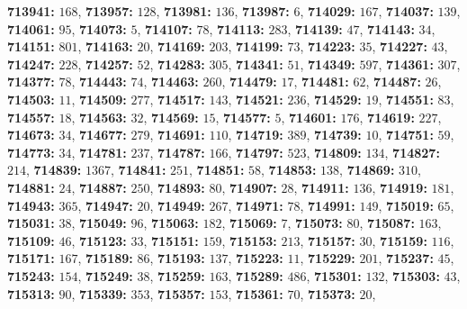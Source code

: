 \textsf{\bfseries 713941:} $168$, \textsf{\bfseries 713957:} $128$, \textsf{\bfseries 713981:} $136$, \textsf{\bfseries 713987:} $6$, \textsf{\bfseries 714029:} $167$, \textsf{\bfseries 714037:} $139$, \textsf{\bfseries 714061:} $95$, \textsf{\bfseries 714073:} $5$, \textsf{\bfseries 714107:} $78$, \textsf{\bfseries 714113:} $283$, \textsf{\bfseries 714139:} $47$, \textsf{\bfseries 714143:} $34$, \textsf{\bfseries 714151:} $801$, \textsf{\bfseries 714163:} $20$, \textsf{\bfseries 714169:} $203$, \textsf{\bfseries 714199:} $73$, \textsf{\bfseries 714223:} $35$, \textsf{\bfseries 714227:} $43$, \textsf{\bfseries 714247:} $228$, \textsf{\bfseries 714257:} $52$, \textsf{\bfseries 714283:} $305$, \textsf{\bfseries 714341:} $51$, \textsf{\bfseries 714349:} $597$, \textsf{\bfseries 714361:} $307$, \textsf{\bfseries 714377:} $78$, \textsf{\bfseries 714443:} $74$, \textsf{\bfseries 714463:} $260$, \textsf{\bfseries 714479:} $17$, \textsf{\bfseries 714481:} $62$, \textsf{\bfseries 714487:} $26$, \textsf{\bfseries 714503:} $11$, \textsf{\bfseries 714509:} $277$, \textsf{\bfseries 714517:} $143$, \textsf{\bfseries 714521:} $236$, \textsf{\bfseries 714529:} $19$, \textsf{\bfseries 714551:} $83$, \textsf{\bfseries 714557:} $18$, \textsf{\bfseries 714563:} $32$, \textsf{\bfseries 714569:} $15$, \textsf{\bfseries 714577:} $5$, \textsf{\bfseries 714601:} $176$, \textsf{\bfseries 714619:} $227$, \textsf{\bfseries 714673:} $34$, \textsf{\bfseries 714677:} $279$, \textsf{\bfseries 714691:} $110$, \textsf{\bfseries 714719:} $389$, \textsf{\bfseries 714739:} $10$, \textsf{\bfseries 714751:} $59$, \textsf{\bfseries 714773:} $34$, \textsf{\bfseries 714781:} $237$, \textsf{\bfseries 714787:} $166$, \textsf{\bfseries 714797:} $523$, \textsf{\bfseries 714809:} $134$, \textsf{\bfseries 714827:} $214$, \textsf{\bfseries 714839:} $1367$, \textsf{\bfseries 714841:} $251$, \textsf{\bfseries 714851:} $58$, \textsf{\bfseries 714853:} $138$, \textsf{\bfseries 714869:} $310$, \textsf{\bfseries 714881:} $24$, \textsf{\bfseries 714887:} $250$, \textsf{\bfseries 714893:} $80$, \textsf{\bfseries 714907:} $28$, \textsf{\bfseries 714911:} $136$, \textsf{\bfseries 714919:} $181$, \textsf{\bfseries 714943:} $365$, \textsf{\bfseries 714947:} $20$, \textsf{\bfseries 714949:} $267$, \textsf{\bfseries 714971:} $78$, \textsf{\bfseries 714991:} $149$, \textsf{\bfseries 715019:} $65$, \textsf{\bfseries 715031:} $38$, \textsf{\bfseries 715049:} $96$, \textsf{\bfseries 715063:} $182$, \textsf{\bfseries 715069:} $7$, \textsf{\bfseries 715073:} $80$, \textsf{\bfseries 715087:} $163$, \textsf{\bfseries 715109:} $46$, \textsf{\bfseries 715123:} $33$, \textsf{\bfseries 715151:} $159$, \textsf{\bfseries 715153:} $213$, \textsf{\bfseries 715157:} $30$, \textsf{\bfseries 715159:} $116$, \textsf{\bfseries 715171:} $167$, \textsf{\bfseries 715189:} $86$, \textsf{\bfseries 715193:} $137$, \textsf{\bfseries 715223:} $11$, \textsf{\bfseries 715229:} $201$, \textsf{\bfseries 715237:} $45$, \textsf{\bfseries 715243:} $154$, \textsf{\bfseries 715249:} $38$, \textsf{\bfseries 715259:} $163$, \textsf{\bfseries 715289:} $486$, \textsf{\bfseries 715301:} $132$, \textsf{\bfseries 715303:} $43$, \textsf{\bfseries 715313:} $90$, \textsf{\bfseries 715339:} $353$, \textsf{\bfseries 715357:} $153$, \textsf{\bfseries 715361:} $70$, \textsf{\bfseries 715373:} $20$, 
